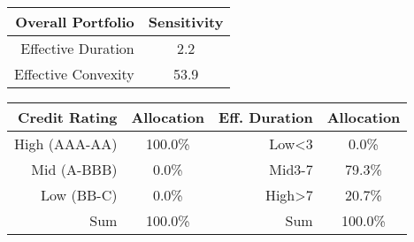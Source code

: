 \center
\begin{tabular}{r | c}
Overall Portfolio & Sensitivity \\\hline\hline
Effective Duration & 2.2 \\
Effective Convexity & 53.9 \\
\end{tabular}
\center
\begin{tabular}{r | c || r | c }
Credit Rating & Allocation & Eff. Duration & Allocation \\\hline\hline
High (AAA-AA) & 100.0\% & Low<3 & 0.0\%  \\
Mid (A-BBB) & 0.0\% & Mid3-7 & 79.3\%  \\
Low (BB-C) & 0.0\% & High>7 & 20.7\%  \\\hline
Sum & 100.0\% & Sum & 100.0\% \\
\end{tabular}
